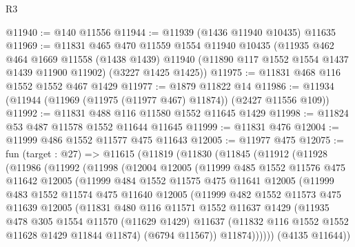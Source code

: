 \begin{lexlean}{R3}
\begin{coremodule}
@11940 := @140 @11556
@11944 := @11939 (@1436 @11940 @10435) @11635
@11969 := @11831
    @465
    @470
    @11559
    @1554
    @11940
    @10435
    (@11935
      @462
      @464
      @1669
      @11558
      (@1438 @1439)
      @11940
      (@11890 @117 @1552 @1554 @1437 @1439 @11900 @11902)
      (@3227 @1425 @1425))
@11975 := @11831 @468 @116 @1552 @1552 @467 @1429
@11977 := @1879 @11822 @14
@11986 := @11934 (@11944 (@11969 (@11975 (@11977 @467) @11874)) (@2427 @11556 @109))
@11992 := @11831 @488 @116 @11580 @1552 @11645 @1429
@11998 := @11824 @53 @487 @11578 @1552 @11644 @11645
@11999 := @11831 @476
@12004 := @11999 @486 @1552 @11577 @475 @11643
@12005 := @11977 @475
@12075 := fun (target : @27) =>
  @11615
    (@11819
      (@11830
        (@11845
          (@11912
            (@11928
              (@11986
                (@11992
                  (@11998
                    (@12004
                      @12005
                      (@11999
                        @485
                        @1552
                        @11576
                        @475
                        @11642
                        @12005
                        (@11999
                          @484
                          @1552
                          @11575
                          @475
                          @11641
                          @12005
                          (@11999
                            @483
                            @1552
                            @11574
                            @475
                            @11640
                            @12005
                            (@11999
                              @482
                              @1552
                              @11573
                              @475
                              @11639
                              @12005
                              (@11831
                                @480
                                @116
                                @11571
                                @1552
                                @11637
                                @1429
                                (@11935
                                  @478
                                  @305
                                  @1554
                                  @11570
                                  (@11629 @1429)
                                  @11637
                                  (@11832 @116 @1552 @1552 @11628 @1429 @11844 @11874)
                                  (@6794 @11567))
                                @11874))))))
                    (@4135 @11644))

\end{coremodule}
\end{lexlean}
